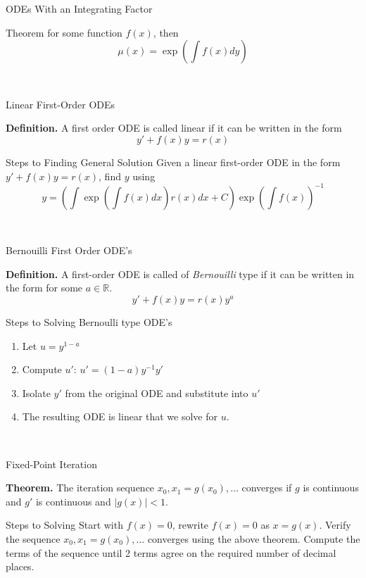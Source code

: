 \documentclass{article}
\begin{document}
\begin{multicols*}{3}
\begin{blackbox}{ODEs With an Integrating Factor}
{\begin{redbox}{Theorem}
        for some function $f(x)$, then\\[-2ex]
        \[\mu(x) = \exp\left(\int f(x) dy\right)\]
    \end{redbox}\\[-2ex]
    }
\end{blackbox}
\begin{blackbox}{Linear First-Order ODEs}
    {\scriptsize
        \textbf{Definition.} A first order ODE is called linear if it can be written in the form\\[-2ex]
        \[y' + f(x)y = r(x)\]
        \begin{bluebox}{Steps to Finding General Solution}
            Given a linear first-order ODE in the form $y' + f(x)y = r(x)$, find $y$ using 
            \[y = \left(\int \exp\left(\int f(x)dx\right)r(x)dx + C\right)\exp\left(\int f(x)\right)^{-1}\]
        \end{bluebox}\\[-2ex]
    }
\end{blackbox} 
\begin{blackbox}{Bernouilli First Order ODE's}
    {\scriptsize
            \textbf{Definition.} A first-order ODE is called of \emph{Bernouilli} type if it can be written in the form for some $a \in \mathbb{R}$.  \\[-2ex]
            \[y' + f(x)y = r(x)y^a\]
        \begin{redbox}{Steps to Solving Bernoulli type ODE's}
            \begin{enumerate}
                \item Let $u = y^{1-a}$
                \item Compute $u'$: $u' = (1-a)y^{-1}y'$
                \item Isolate $y'$ from the original ODE and substitute into $u'$
                \item The resulting ODE is linear that we solve for $u$.  
            \end{enumerate}
        \end{redbox}\\[-2ex]
    }
\end{blackbox}
\begin{blackbox}{Fixed-Point Iteration}
    {\scriptsize 
    \textbf{Theorem.} The iteration sequence $x_0, x_1 = g(x_0), \ldots$ converges if $g$ is continuous and $g'$ is continuous and $|g(x)| < 1$. 
    \begin{bluebox}{Steps to Solving}
        Start with $f(x) = 0$, rewrite $f(x) = 0$ as $x = g(x)$. Verify the sequence $x_0, x_1 = g(x_0), \ldots$ converges using the above theorem. Compute the terms of the sequence until 2 terms agree on the required number of decimal places.

\end{bluebox}}
\end{blackbox}
\end{multicols*}
\end{document}
